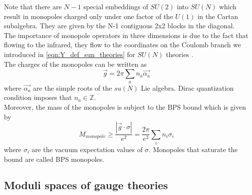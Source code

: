 Note that there are $N-1$ special embeddings of $SU(2)$ into $SU(N)$ which result in monopoles charged only under one factor of the $U(1)$ in the Cartan subalgebra. They are given by the N-1 contiguous 2x2 blocks in the diagonal.\\
The importance of monopole operators in three dimensions is due to the fact that flowing to the infrared, they flow to the coordinates on the Coulomb branch we introduced in \eqref{eqn:Y_def_sun_theories} for $SU(N)$ theories \cite{Aharony:2013dha}.
\\
The charges of the monopoles can be written as
\begin{equation}
\vec{g}  = 2 \pi \sum_a n_a \vec{\alpha_a}
\end{equation}
where $\vec{\alpha_a}$ are the simple roots of the $su(N)$ Lie algebra. Dirac quantization condition imposes that $n_a \in \mathbb{Z}$.\\
Moreover, the mass of the monopoles is subject to the BPS bound which is given by
\begin{equation}
M_{monopole} \geq \frac{| \vec{g} \cdot \sigma| }{e^2} = \frac{2 \pi}{e^2} \sum_i n_i \sigma_i
\end{equation}
where $\sigma_i$ are the vacuum expectation values of $\sigma$.
Monopoles that saturate the bound are called BPS monopoles.\\

 























 \subsection{Moduli spaces of gauge theories}










